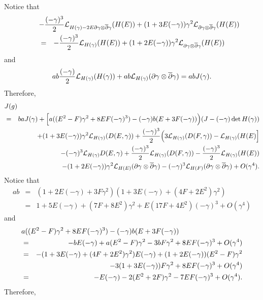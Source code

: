 \documentclass[12pt]{amsart}
\def\d{\partial}
\def\dbar{\overline{\partial}}
\def\d{\partial}
\def\cal{\mathcal}
\begin{document}
Notice that 
\begin{eqnarray*}
\lefteqn{-{(-\gamma)^3\over 2} {\cal L}_{H(\gamma)-2E\d \gamma\otimes \dbar \gamma } (H(E))
+(1+3E(-\gamma) )\gamma^2{\cal L}_{\d \gamma \otimes\dbar \gamma}(H(E))}\\
&=&-{(-\gamma)^3\over 2} {\cal L}_{H(\gamma)}(H(E))+(1+2E(-\gamma))\gamma^2 {\cal L}_{\d \gamma \otimes\dbar \gamma}(H(E))
\end{eqnarray*}
and
$$
ab {(-\gamma) \over 2} {\cal L}_{H(\gamma)}(H(\gamma))+ab {\cal L}_{H(\gamma)}(\d \gamma\otimes
\dbar \gamma)
=ab J(\gamma).
$$
Therefore,
\begin{eqnarray*}
\lefteqn{J(g)}\\&=& b  a J(\gamma)+ \Big[a ((E^2-F)\gamma^2+8EF(-\gamma)^3)  
-(-\gamma) b (E+3F(-\gamma))\Big) (J-(-\gamma) \det H(\gamma))  \nonumber\\
&&+(1+3E(-\gamma))  \gamma^2 {\cal L}_{H(\gamma)}(D(E, \gamma)) +{(-\gamma)^3\over 2}\Big(3 {\cal L}_{H(\gamma)}(D(F,\gamma))-{\cal L}_{H(\gamma)}(H(E)\Big]\\
&&
-(-\gamma)^3 {\cal L}_{H(\gamma)} D(E, \gamma)+{  (-\gamma) ^3 \over 2} {\cal L}_{H(\gamma)} (D(F, \gamma))
-{(-\gamma)^3 \over 2}  {\cal L}_{H(\gamma)} (H(E)) \\
&&-(1+2E(-\gamma)) \gamma^2 {\cal L}_{H(E)}(\d \gamma\otimes \dbar \gamma)-(-\gamma)^3 {\cal L}_{H(F)}(\d \gamma \otimes \dbar \gamma) +O(\gamma^4 ).
\end{eqnarray*}
Notice that
\begin{eqnarray*}
ab&=&(1+2E(-\gamma)+3F\gamma^2)(1+3E(-\gamma)+(4F+2E^2)\gamma^2)\\
&=&1+5E(-\gamma)+(7F+8E^2)\gamma^2+E(17F+4E^2)(-\gamma)^3+O(\gamma^4)
\end{eqnarray*}
and
\begin{eqnarray*}
\lefteqn{ a ((E^2-F)\gamma^2+8EF(-\gamma)^3)   -(-\gamma) b (E+3F(-\gamma)) }\\
&=&-bE (-\gamma)+a(E^2-F)\gamma^2-3bF \gamma^2+8 EF(-\gamma)^3+O(\gamma^4) \\
&=&-(1+3E(-\gamma)+(4F+2E^2)\gamma^2) E (-\gamma)+(1+2E(-\gamma))(E^2-F)\gamma^2\\
&&-3(1+3E(-\gamma)) F \gamma^2+8 EF(-\gamma)^3+O(\gamma^4) \\
&=&-E(-\gamma)-2(E^2 +2F)\gamma^2-7EF(-\gamma)^3+O(\gamma^4).
\end{eqnarray*}
Therefore,
\end{document}
